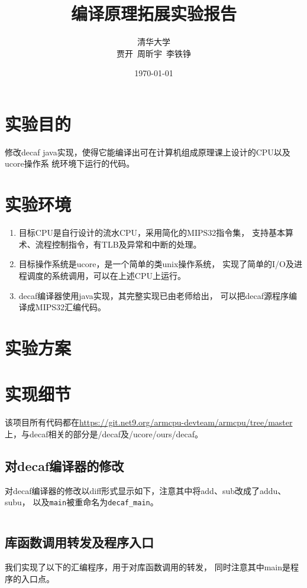 \documentclass[a4paper]{article}
\title{编译原理拓展实验报告}
\author{清华大学\\贾开~周昕宇~李铁铮}
\date{\today}
\begin{document}
\maketitle

\tableofcontents

\section{实验目的}
修改decaf java实现，使得它能编译出可在计算机组成原理课上设计的CPU以及ucore操作系
统环境下运行的代码。

\section{实验环境}
\begin{enumerate}
	\item 目标CPU是自行设计的流水CPU，采用简化的MIPS32指令集，
		支持基本算术、流程控制指令，有TLB及异常和中断的处理。
	\item 目标操作系统是ucore，是一个简单的类unix操作系统，
		实现了简单的I/O及进程调度的系统调用，可以在上述CPU上运行。
	\item decaf编译器使用java实现，其完整实现已由老师给出，
		可以把decaf源程序编译成MIPS32汇编代码。
\end{enumerate}


\section{实验方案}



\section{实现细节}
该项目所有代码都在\url{https://git.net9.org/armcpu-devteam/armcpu/tree/master}
上，与decaf相关的部分是/decaf及/ucore/ours/decaf。

\subsection{对decaf编译器的修改}
对decaf编译器的修改以diff形式显示如下，注意其中将add、sub改成了addu、subu，
以及\verb|main|被重命名为\verb|decaf_main|。
\inputminted[linenos,fontsize=\small,tabsize=4]{diff}{../decaf.diff}


\subsection{库函数调用转发及程序入口}
我们实现了以下的汇编程序，用于对库函数调用的转发，
同时注意其中main是程序的入口点。
\inputminted[linenos,fontsize=\small,tabsize=4]{nasm}{../entry.s}
\end{document}
